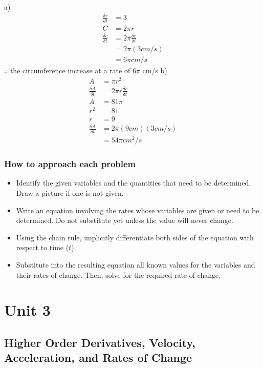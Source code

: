 \documentclass{article}
\begin{document}
a) 
\begin{align*}
    \frac{\delta r}{dt}&=3\\
    C&=2\pi r\\
    \frac{\delta c }{\delta t}&=2 \pi \frac{\delta r}{\delta t}\\
    &=2 \pi (3cm/s)\\
    &=6 \pi cm/s 
\end{align*}
$\therefore$ the circumference increase at a rate of $6 \pi$ cm/s
b) 
\begin{align*}
    A&=\pi r^2\\
    \frac{\delta A}{\delta t} &=2\pi r \frac{\delta r}{\delta t}\\
    A&=81 \pi \\
    r^2&=81\\
    r&=9\\
    \frac{\delta A}{\delta t}&=2\pi (9 cm)(3cm/s)\\
    &=54\pi cm^2/s
\end{align*}

 
\subsubsection{How to approach each problem}
\begin{itemize}
    \item Identify the given variables and the quantities that need to be determined. Draw a picture if one is not given.

    \item Write an equation involving the rates whose variables are given or need to be determined. Do not substitute yet unless the value will never change.

    \item Using the chain rule, implicitly differentiate both sides of the equation with respect to time ($t$).

    \item Substitute into the resulting equation all known values for the variables and their rates of change. Then, solve for the required rate of change.	
\end{itemize}

\section{Unit 3}
\subsection{Higher Order Derivatives, Velocity, Acceleration, and Rates of Change}
\end{document}
